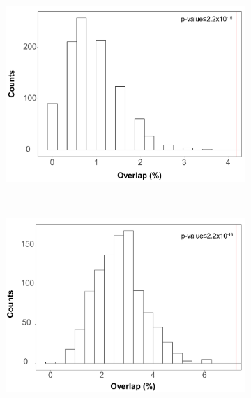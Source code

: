 \bigskip
\begin{figure}[htbp]
\centering
\begin{subfigure}[b]{0.40\textwidth}
\centering 
\includegraphics[width=\textwidth]{./Results3/pdfs/PsA_FM_enrichment_for_NK_DARs_ATAC_peaks_window}%
\caption{}
\end{subfigure}
~
\begin{subfigure}[b]{0.40\textwidth}
\centering 
\includegraphics[width=\textwidth]{./Results3/pdfs/PsA_FM_enrichment_for_CD14_consensus_ATAC_peaks_inside}%
\caption{}
\end{subfigure}%
~
\begin{subfigure}[b]{0.40\textwidth}
\centering 

\end{subfigure}
\end{figure}
